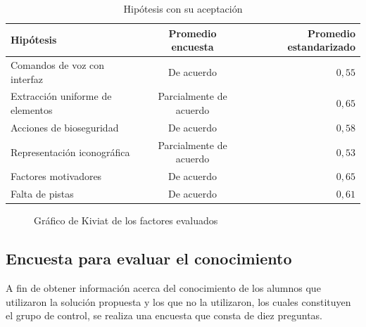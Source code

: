 \begin{table}[H]
\centering
\caption{Hipótesis con su aceptación}
\begin{tabular}{lcr}
\toprule
Hipótesis                        & Promedio encuesta     & Promedio estandarizado \\
\midrule
Comandos de voz con interfaz     & De acuerdo              & $0,55$ \\
Extracción uniforme de elementos & Parcialmente de acuerdo & $0,65$ \\
Acciones de bioseguridad         & De acuerdo              & $0,58$ \\
Representación iconográfica      & Parcialmente de acuerdo & $0,53$ \\
Factores motivadores             & De acuerdo              & $0,65$ \\
Falta de pistas                  & De acuerdo              & $0,61$ \\
\bottomrule
\end{tabular}

\label{tab:resultado_resumen_hipotesis}
\end{table}

\begin{figure}[H]
\centering
{}
\label{fig:subjetiva_kiviat}
\caption{Gráfico de Kiviat de los factores evaluados}
\end{figure}

\subsection{Encuesta para evaluar el conocimiento}
\label{encuesta_conocimiento}
A fin de obtener información acerca del conocimiento de los alumnos que 
utilizaron la solución propuesta y los que no la utilizaron, los cuales 
constituyen el grupo de control, se realiza una encuesta que consta de diez 
preguntas.

